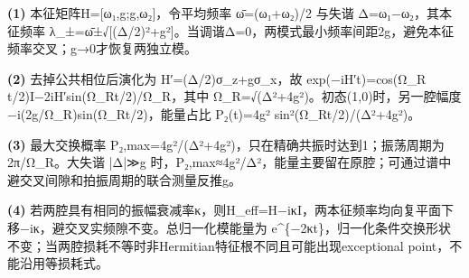 \par\noindent\textbf{(1)} 本征矩阵H=[ω₁,g;g,ω₂]，令平均频率 ω̄=(ω₁+ω₂)/2 与失谐 Δ=ω₁−ω₂，其本征频率 λ\_±=ω̄±√[(Δ/2)²+g²]。当调谐Δ=0，两模式最小频率间距2g，避免本征频率交叉；g→0才恢复两独立模。
\par\noindent\textbf{(2)} 去掉公共相位后演化为 H′=(Δ/2)σ\_z+gσ\_x，故 exp(−iH′t)=cos(Ω\_R t/2)I−2iH′sin(Ω\_Rt/2)/Ω\_R，其中 Ω\_R=√(Δ²+4g²)。初态(1,0)时，另一腔幅度 −i(2g/Ω\_R)sin(Ω\_Rt/2)，能量占比 P₂(t)=4g² sin²(Ω\_Rt/2)/(Δ²+4g²)。
\par\noindent\textbf{(3)} 最大交换概率 P₂,max=4g²/(Δ²+4g²)，只在精确共振时达到1；振荡周期为 2π/Ω\_R。大失谐 |Δ|≫g 时，P₂,max≈4g²/Δ²，能量主要留在原腔；可通过谱中避交叉间隙和拍振周期的联合测量反推g。
\par\noindent\textbf{(4)} 若两腔具有相同的振幅衰减率κ，则H\_eff=H−iκI，两本征频率均向复平面下移−iκ，避交叉实频隙不变。总归一化模能量为 e\textasciicircum{}\{−2κt\}，归一化条件交换形状不变；当两腔损耗不等时非Hermitian特征根不同且可能出现exceptional point，不能沿用等损耗式。
